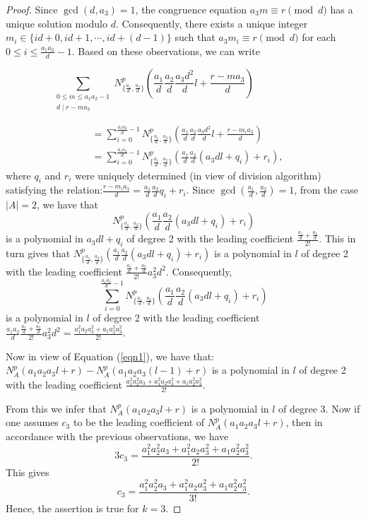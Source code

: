 \documentclass[11pt]{article}
\begin{document}
\begin{proof}
Since $\gcd(d,a_3)=1$,  the congruence equation $a_3m\equiv r\pmod d$ has a unique solution modulo $d$. Consequently, there exists a unique integer   $m_i\in\{id+0,id+1,\cdots ,id+(d-1)\}$ such that $a_3m_i\equiv r\pmod d$ for each $0\leq i\leq\frac{a_1a_2}{d}-1$. Based on these observations, we can write

\[
\sum_{\substack{0\leq m\leq a_1a_2-1\\ d\mid r-ma_3}}N^p_{\{\frac{a_1}{d},\frac{a_2}{d}\}}\left(\frac{a_1}{d}\frac{a_2}{d}\frac{a_3d^2}{d}l+\frac{r-ma_3}{d}\right)\ \ \ \ \ \ \ \ \ \ \ \ \ \ \ \ \ \ \ \ \ \ \ \ \ \ \ \ 
\]


\begin{align*}
&=\sum_{i=0}^{\frac{a_1a_2}{d}-1}N^p_{\{\frac{a_1}{d},\frac{a_2}{d}\}}\left(\frac{a_1}{d}\frac{a_2}{d}\frac{a_3d^2}{d}l+\frac{r-m_ia_3}{d}\right)\\
&=\sum_{i=0}^{\frac{a_1a_2}{d}-1}N^p_{\{\frac{a_1}{d},\frac{a_2}{d}\}}\left(\frac{a_1}{d}\frac{a_2}{d}\left(a_3dl+q_i\right)+r_i\right),
\end{align*}
where $q_i$ and $r_i$ were uniquely determined (in view of division algorithm) satisfying the relation:$\frac{r-m_ia_3}{d}=\frac{a_1}{d}\frac{a_2}{d}q_i+r_i$. Since $\gcd(\frac{a_1}{d},\frac{a_2}{d})=1$, from the case $|A|=2$, we have that \[N^p_{\{\frac{a_1}{d},\frac{a_2}{d}\}}\left(\frac{a_1}{d}\frac{a_2}{d}\left(a_3dl+q_i\right)+r_i\right)\] is a polynomial in $a_3dl+q_i$ of degree 2 with the leading coefficient $\frac{\frac{a_1}{d}+\frac{a_2}{d}}{2!}$. This in turn gives that $N^p_{\{\frac{a_1}{d},\frac{a_2}{d}\}}\left(\frac{a_1}{d}\frac{a_2}{d}\left(a_3dl+q_i\right)+r_i\right)$ is a polynomial in $l$ of degree 2 with the leading coefficient $\frac{\frac{a_1}{d}+\frac{a_2}{d}}{2!}a_3^2d^2$. Consequently, \[\sum_{i=0}^{\frac{a_1a_2}{d}-1}N^p_{\{\frac{a_1}{d},\frac{a_2}{d}\}}\left(\frac{a_1}{d}\frac{a_2}{d}\left(a_3dl+q_i\right)+r_i\right)\] is a polynomial in $l$ of degree 2 with the leading coefficient 
$
\frac{a_1a_2}{d}\frac{\frac{a_1}{d}+\frac{a_2}{d}}{2!}a_3^2d^2
=\frac{a_1^2a_2a_3^2+a_1a_2^2a_3^2}{2!}$.

Now in view of Equation (\ref{eqn1}), we have that:
$
N_A^p(a_1a_2a_3l+r)-N_A^p(a_1a_2a_3(l-1)+r)
$ is a polynomial in $l$ of degree 2 with the leading coefficient $\frac{a_1^2a_2^2a_3+a_1^2a_2a_3^2+a_1a_2^2a_3^2}{2!}$.

From this we infer that $N_A^p(a_1a_2a_3l+r)$ is a polynomial in $l$ of degree 3. Now if one assumes $c_3$ to be the leading coefficient of $N_A^p(a_1a_2a_3l+r)$, then in accordance with the previous observations, we have
\[
3c_3=\frac{a_1^2a_2^2a_3+a_1^2a_2a_3^2+a_1a_2^2a_3^2}{2!}.
\]
This gives 
\[c_3=\frac{a_1^2a_2^2a_3+a_1^2a_2a_3^2+a_1a_2^2a_3^2}{3!}.
\]
Hence, the assertion is true for $k=3$. 


\end{proof}
\end{document}
